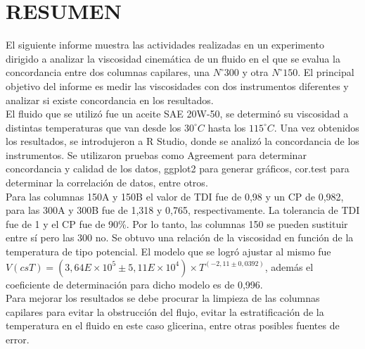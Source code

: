 \documentclass[12pt, letterpaper]{article}
\begin{document}
\tableofcontents

\pagebreak

\section{RESUMEN}

El siguiente informe muestra las actividades realizadas en un experimento dirigido a analizar la viscosidad cinemática de un fluido en el que se evalua la concordancia entre dos columnas capilares, una $N^{\circ}300$ y otra $N^{\circ}150$. El principal objetivo del informe es medir las viscosidades con dos instrumentos diferentes y analizar si existe concordancia en los resultados.\\
El fluido que se utilizó fue un aceite SAE 20W-50, se determinó su viscosidad a distintas temperaturas que van desde los $30^{\circ}C$ hasta los $115^{\circ}C$. Una vez obtenidos los resultados, se introdujeron a R Studio, donde se analizó la concordancia de los instrumentos. Se utilizaron pruebas como Agreement para determinar concordancia y calidad de los datos, ggplot2 para generar gráficos, cor.test para determinar la correlación de datos, entre otros.\\
Para las columnas 150A y 150B el valor de TDI fue de 0,98 y un CP de 0,982, para las 300A y 300B fue de 1,318 y 0,765, respectivamente. La tolerancia de TDI fue de 1 y el CP fue de 90\%. Por lo tanto, las columnas 150 se pueden sustituir entre sí pero las 300 no. Se obtuvo una relación de la viscosidad en función de la temperatura de tipo potencial. El modelo que se logró ajustar al mismo fue $V(csT)= (3,64E\times10^{5} \pm 5,11E\times10^{4}) \times T^{(-2,11 \pm 0,0392)}$, además el coeficiente de determinación para dicho modelo es de 0,996.\\ 
Para mejorar los resultados se debe procurar la limpieza de las columnas capilares para evitar la obstrucción del flujo, evitar la estratificación de la temperatura en el fluido en este caso glicerina, entre otras posibles fuentes de error.

\end{document}
